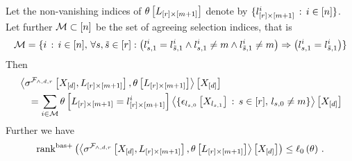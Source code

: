 \begin{theorem}
    Let the non-vanishing indices of $\theta\left[L_{[r]\times[m+1]}\right]$ denote by $\{l_{[r]\times[m+1]}^{i} \, : \, i\in[n]\}$.
    Let further $\mathcal{M}\subset[n]$ be the set of agreeing selection indices, that is
    \begin{align*}
        \mathcal{M} = \{ i \, : \, i\in[n],\,
        \forall{s,\tilde{s}\in[r]} : \big( l_{s,1}^i= l_{\tilde{s},1}^i  \land l_{s,1}^i\neq m \land l_{\tilde{s},1}^i \neq m \big)
        \Rightarrow \big(l_{s,1}^i = l_{\tilde{s},1}^i \big)
        \}
    \end{align*}
    Then
    \begin{align*}
        &\left\langle \sigma^{\mathcal{F}_{\land,d,r}}\left[X_{[d]},L_{[r]\times[m+1]}\right],\theta\left[L_{[r]\times[m+1]}\right]\right\rangle \left[ X_{[d]} \right] \\
        &\quad = \sum_{i\in\mathcal{M}} \theta\left[L_{[r]\times[m+1]}=l_{[r]\times[m+1]}^{i}\right]
        \left\langle \{\epsilon_{l_{s,0}}\left[X_{l_{s,1}}\right] \, : \, s\in[r], \, l_{s,0}\neq m \}\right\rangle \left[ X_{[d]} \right]
    \end{align*}
    Further we have
    \begin{align*}
        \mathrm{rank}^{\mathrm{bas+}}\left(\left\langle \sigma^{\mathcal{F}_{\land,d,r}}\left[X_{[d]},L_{[r]\times[m+1]}\right],\theta\left[L_{[r]\times[m+1]}\right]\right\rangle \left[ X_{[d]} \right]\right)
        \leq \ell_0\left(\theta\right) \, .
    \end{align*}
\end{theorem}

